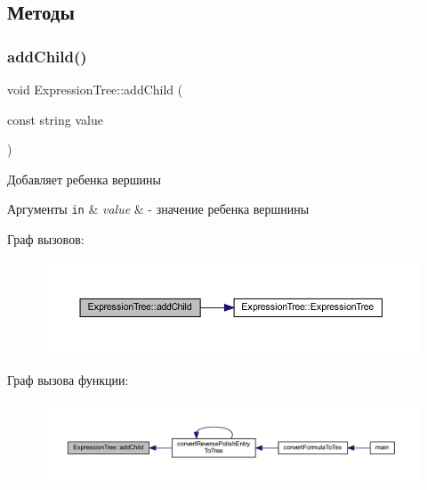 \subsection{Методы}
\mbox{\label{class_expression_tree_a1c8682a7b97a3e8a9834e545b944c61d}} 
\subsubsection{\texorpdfstring{add\+Child()}{addChild()}\hspace{0.1cm}{\footnotesize\ttfamily [1/2]}}
{\footnotesize\ttfamily void Expression\+Tree\+::add\+Child (\begin{DoxyParamCaption}\item[{const string}]{value }\end{DoxyParamCaption})}



Добавляет ребенка вершины 


\begin{DoxyParams}[1]{Аргументы}
\mbox{\tt in}  & {\em value} & -\/ значение ребенка вершнины \\
\hline
\end{DoxyParams}
Граф вызовов\+:\nopagebreak
\begin{figure}[H]
\begin{center}
\leavevmode
\includegraphics[width=350pt]{class_expression_tree_a1c8682a7b97a3e8a9834e545b944c61d_cgraph}
\end{center}
\end{figure}
Граф вызова функции\+:\nopagebreak
\begin{figure}[H]
\begin{center}
\leavevmode
\includegraphics[width=350pt]{class_expression_tree_a1c8682a7b97a3e8a9834e545b944c61d_icgraph}
\end{center}
\end{figure}
\mbox{\label{class_expression_tree_a5bc1b25f4ae25975bf086ebf3a95d6e7}} 
